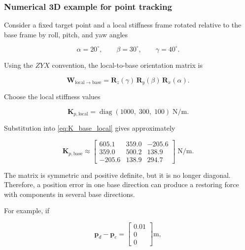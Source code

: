 \subsubsection*{Numerical 3D example for point tracking}

Consider a fixed target point and a local stiffness frame rotated relative to
the base frame by roll, pitch, and yaw angles

\begin{equation}
\alpha = 20^{\circ},\qquad
\beta = 30^{\circ},\qquad
\gamma = 40^{\circ}.
\end{equation}

Using the \(ZYX\) convention, the local-to-base orientation matrix is

\begin{equation}
\label{eq:W_rpy}
\mathbf{W}_{\mathrm{local}\rightarrow\mathrm{base}}
=
\mathbf{R}_z(\gamma)\,\mathbf{R}_y(\beta)\,\mathbf{R}_x(\alpha).
\end{equation}

Choose the local stiffness values

\begin{equation}
\label{eq:K_local_numeric}
\mathbf{K}_{p,\mathrm{local}}
=
\operatorname{diag}(1000,\;300,\;100)\;\mathrm{N/m}.
\end{equation}

Substitution into \cref{eq:K_base_local} gives approximately

\begin{equation}
\label{eq:K_base_numeric_tracking}
\mathbf{K}_{p,\mathrm{base}}
\approx
\begin{bmatrix}
605.1 & 359.0 & -205.6\\
359.0 & 500.2 & 138.9\\
-205.6 & 138.9 & 294.7
\end{bmatrix}
\;\mathrm{N/m}.
\end{equation}

The matrix is symmetric and positive definite, but it is no longer diagonal.
Therefore, a position error in one base direction can produce a restoring
force with components in several base directions.

For example, if

\begin{equation}
\label{eq:tracking_error_numeric}
\mathbf{p}_d-\mathbf{p}_e
=
\begin{bmatrix}
0.01\\0\\0
\end{bmatrix}
\mathrm{m},
\end{equation}

